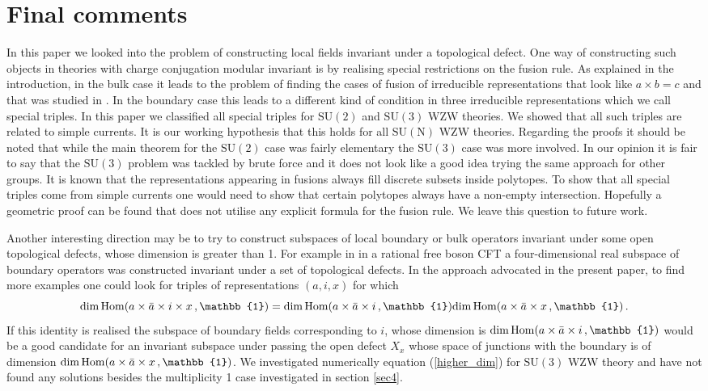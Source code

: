 \documentclass[a4paper,11pt]{article}
\theoremstyle{plain}
\theoremstyle{definition}
\def\be{\begin{equation}}
\def\ee{\end{equation}}
\begin{document}
\section{Final comments} \label{sec_comments}
In this paper we looked into the problem of constructing local fields invariant under a topological defect. One way of constructing such objects in theories 
with charge conjugation modular invariant is 
by realising special restrictions on the fusion rule. As explained in the introduction, in the bulk case it leads to the problem of finding the cases of fusion 
of irreducible representations that look like $a\times b = c$ and that was studied in \cite{Buican}. In the boundary case this leads to a different kind 
of condition in three irreducible representations  which we call special triples. In this paper we classified all special triples for $\mathrm{SU(2)}$ and 
$\mathrm{SU(3)}$ WZW theories. We showed that all such triples are related to simple currents. It is our working hypothesis that this holds for all 
$\mathrm{SU(N)}$ WΖW theories. Regarding the proofs it should be noted that while the main theorem for the $\mathrm{SU(2)}$ case was fairly elementary the $\mathrm{SU(3)}$ case was more involved. 
In our opinion it is fair to say that  the $\mathrm{SU(3)}$ problem was tackled by brute force and  it does not look like a good idea trying the same approach for other groups. 
It is known that the representations appearing in fusions always fill discrete subsets inside polytopes. To show that all special triples come from simple currents 
one would need to show that certain polytopes always have a non-empty intersection. Hopefully a geometric proof can be found that does not utilise any explicit formula for the fusion rule. We leave this question to future work. 

Another interesting direction may be to try to construct   subspaces of local boundary or bulk operators invariant under some open topological defects,  whose dimension is greater than 1. 
For example in \cite{paper1} in a rational free boson CFT a four-dimensional real subspace of boundary operators was constructed invariant under 
a set of topological defects.
In the approach  advocated in  the present paper, to find more examples  one could look for triples of representations $(a,i,x)$ for which 
\be \label{higher_dim}
{\rm dim}\, {\rm Hom}(a\times \bar a \times i \times  x\, , \mathbb{1}) = {\rm dim}\, {\rm Hom}(a\times \bar a \times i \, , \mathbb{1}) {\rm dim}\, {\rm Hom}(a\times \bar a  \times  x\, , \mathbb{1}) \, .
\ee
If this identity is realised the subspace of boundary fields corresponding to $i$, whose dimension is  ${\rm dim}\, {\rm Hom}(a\times \bar a \times i \, , \mathbb{1})$ would be a good candidate for an invariant subspace   under passing the open defect $X_{x}$ whose space of junctions with the boundary is of dimension ${\rm dim}\,{\rm Hom}(a\times \bar a  \times  x\, , \mathbb{1})$. We investigated numerically equation (\ref{higher_dim}) for $\mathrm{SU(3)}$ WZW theory and have not found any solutions besides the multiplicity 1 case investigated in section \ref{sec4}. 
\end{document}
